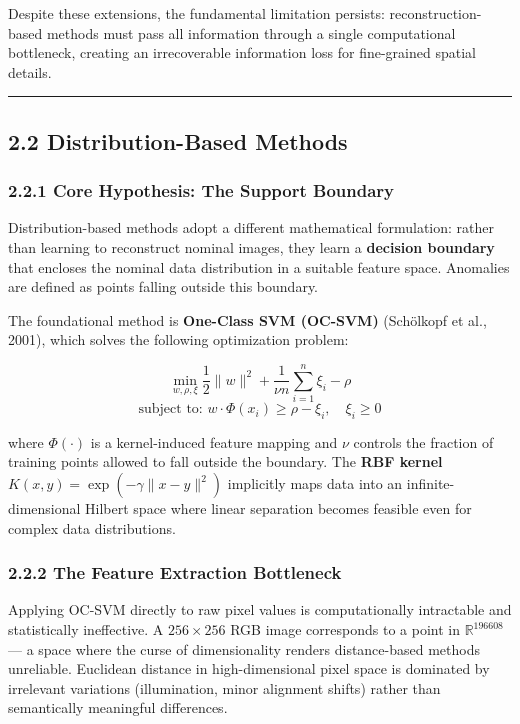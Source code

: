 Despite these extensions, the fundamental limitation persists: reconstruction-based methods must pass all information through a single computational bottleneck, creating an irrecoverable information loss for fine-grained spatial details.

\begin{center}\rule{0.5\linewidth}{0.5pt}\end{center}

\subsection{2.2 Distribution-Based Methods}\label{distribution-based-methods}

\subsubsection{2.2.1 Core Hypothesis: The Support Boundary}\label{core-hypothesis-the-support-boundary}

Distribution-based methods adopt a different mathematical formulation: rather than learning to reconstruct nominal images, they learn a \textbf{decision boundary} that encloses the nominal data distribution in a suitable feature space. Anomalies are defined as points falling outside this boundary.

The foundational method is \textbf{One-Class SVM (OC-SVM)} (Schölkopf et al., 2001), which solves the following optimization problem:

\[\min_{w, \rho, \xi} \frac{1}{2} \|w\|^2 + \frac{1}{\nu n} \sum_{i=1}^{n} \xi_i - \rho\] \[\text{subject to: } w \cdot \Phi(x_i) \geq \rho - \xi_i, \quad \xi_i \geq 0\]

where \(\Phi(\cdot)\) is a kernel-induced feature mapping and \(\nu\) controls the fraction of training points allowed to fall outside the boundary. The \textbf{RBF kernel} \(K(x,y) = \exp(-\gamma \|x - y\|^2)\) implicitly maps data into an infinite-dimensional Hilbert space where linear separation becomes feasible even for complex data distributions.

\subsubsection{2.2.2 The Feature Extraction Bottleneck}\label{the-feature-extraction-bottleneck}

Applying OC-SVM directly to raw pixel values is computationally intractable and statistically ineffective. A \(256 \times 256\) RGB image corresponds to a point in \(\mathbb{R}^{196608}\) --- a space where the curse of dimensionality renders distance-based methods unreliable. Euclidean distance in high-dimensional pixel space is dominated by irrelevant variations (illumination, minor alignment shifts) rather than semantically meaningful differences.

